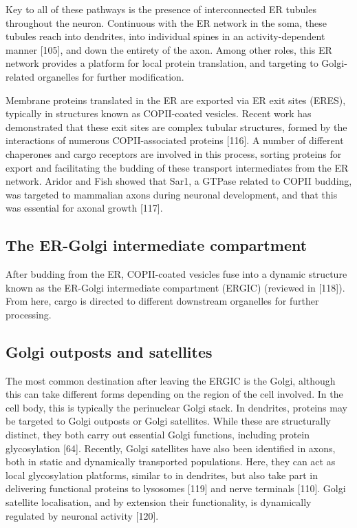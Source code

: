 \documentclass[
  12pt,
  a4paper,
]{book}
\begin{document}
Key to all of these pathways is the presence of interconnected ER tubules throughout the neuron. Continuous with the ER network in the soma, these tubules reach into dendrites, into individual spines in an activity-dependent manner {[}105{]}, and down the entirety of the axon. Among other roles, this ER network provides a platform for local protein translation, and targeting to Golgi-related organelles for further modification.

Membrane proteins translated in the ER are exported via ER exit sites (ERES), typically in structures known as COPII-coated vesicles. Recent work has demonstrated that these exit sites are complex tubular structures, formed by the interactions of numerous COPII-associated proteins {[}116{]}. A number of different chaperones and cargo receptors are involved in this process, sorting proteins for export and facilitating the budding of these transport intermediates from the ER network. Aridor and Fish showed that Sar1, a GTPase related to COPII budding, was targeted to mammalian axons during neuronal development, and that this was essential for axonal growth {[}117{]}.

\hypertarget{the-er-golgi-intermediate-compartment}{%
\subsection{The ER-Golgi intermediate compartment}\label{the-er-golgi-intermediate-compartment}}

After budding from the ER, COPII-coated vesicles fuse into a dynamic structure known as the ER-Golgi intermediate compartment (ERGIC) (reviewed in {[}118{]}). From here, cargo is directed to different downstream organelles for further processing.

\hypertarget{golgi-outposts-and-satellites}{%
\subsection{Golgi outposts and satellites}\label{golgi-outposts-and-satellites}}

The most common destination after leaving the ERGIC is the Golgi, although this can take different forms depending on the region of the cell involved. In the cell body, this is typically the perinuclear Golgi stack. In dendrites, proteins may be targeted to Golgi outposts or Golgi satellites. While these are structurally distinct, they both carry out essential Golgi functions, including protein glycosylation {[}64{]}. Recently, Golgi satellites have also been identified in axons, both in static and dynamically transported populations. Here, they can act as local glycosylation platforms, similar to in dendrites, but also take part in delivering functional proteins to lysosomes {[}119{]} and nerve terminals {[}110{]}. Golgi satellite localisation, and by extension their functionality, is dynamically regulated by neuronal activity {[}120{]}.
\end{document}
